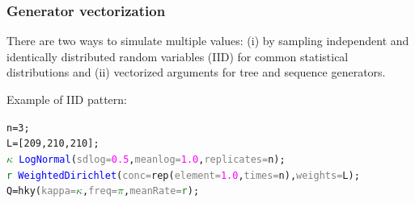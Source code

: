 \documentclass[10pt,letterpaper,table]{article}
\begin{document}
\subsubsection{Generator vectorization}
There are two ways to simulate multiple values: (i) by sampling independent and identically distributed random variables (IID) for common statistical distributions and (ii) vectorized arguments for tree and sequence generators.

Example of IID pattern: 
{\small
  \begin{alltt}
    n = 3;
    L = [209, 210, 210];
    \textcolor{green}{\(\kappa\)} ~ \textcolor{blue}{LogNormal}(\textcolor{gray}{sdlog=}\textcolor{magenta}{0.5}, \textcolor{gray}{meanlog=}\textcolor{magenta}{1.0}, \textcolor{gray}{replicates=}n);
    \textcolor{green}{r} ~ \textcolor{blue}{WeightedDirichlet}(\textcolor{gray}{conc=}\textcolor{magenta!80!black}{rep}(\textcolor{gray}{element=}\textcolor{magenta}{1.0}, \textcolor{gray}{times=}n), \textcolor{gray}{weights=}L);
    Q = \textcolor{magenta!80!black}{hky}(\textcolor{gray}{kappa=}\textcolor{green}{\(\kappa\)}, \textcolor{gray}{freq=}\textcolor{green}{\(\pi\)}, \textcolor{gray}{meanRate=}\textcolor{green}{r});
  \end{alltt}
}
\end{document}
